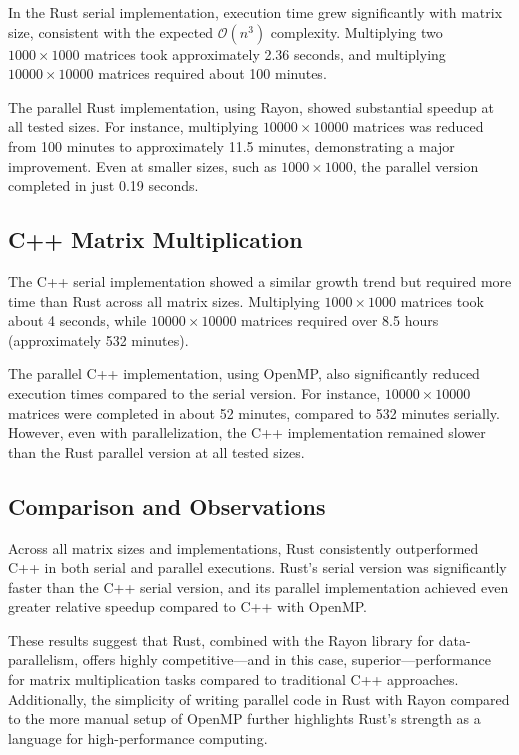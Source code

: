 \documentclass[12pt]{article}
\begin{document}
In the Rust serial implementation, execution time grew significantly with matrix size, consistent with the expected \( \mathcal{O}(n^3) \) complexity.
Multiplying two \(1000 \times 1000\) matrices took approximately 2.36 seconds, and multiplying \(10000 \times 10000\) matrices required about 100 minutes.

The parallel Rust implementation, using Rayon, showed substantial speedup at all tested sizes. For instance, multiplying \(10000 \times 10000\) matrices
was reduced from 100 minutes to approximately 11.5 minutes, demonstrating a major improvement. Even at smaller sizes, such as \(1000 \times 1000\), the
parallel version completed in just 0.19 seconds.

\subsection{C++ Matrix Multiplication}

The C++ serial implementation showed a similar growth trend but required more time than Rust across all matrix sizes. Multiplying \(1000 \times 1000\) matrices
took about 4 seconds, while \(10000 \times 10000\) matrices required over 8.5 hours (approximately 532 minutes).

The parallel C++ implementation, using OpenMP, also significantly reduced execution times compared to the serial version. For instance, \(10000 \times 10000\)
matrices were completed in about 52 minutes, compared to 532 minutes serially. However, even with parallelization, the C++ implementation remained slower
than the Rust parallel version at all tested sizes.

\subsection{Comparison and Observations}

Across all matrix sizes and implementations, Rust consistently outperformed C++ in both serial and parallel executions. Rust's serial version was significantly
faster than the C++ serial version, and its parallel implementation achieved even greater relative speedup compared to C++ with OpenMP.

These results suggest that Rust, combined with the Rayon library for data-parallelism, offers highly competitive—and in this case, superior—performance for
matrix multiplication tasks compared to traditional C++ approaches. Additionally, the simplicity of writing parallel code in Rust with Rayon compared to the
more manual setup of OpenMP further highlights Rust's strength as a language for high-performance computing.
\end{document}
